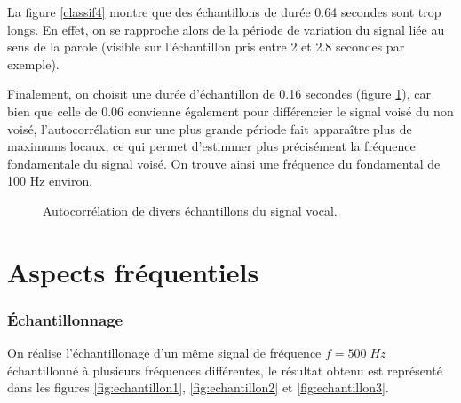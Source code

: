 \documentclass[french]{article}
\begin{document}
La figure \ref{classif4} montre que des échantillons de durée 0.64 secondes sont trop longs. En effet, on se rapproche alors de la période de variation du signal liée au sens de la parole (visible sur l'échantillon pris entre 2 et 2.8 secondes par exemple).


Finalement,  on choisit une durée d'échantillon de 0.16 secondes (figure \ref{classif3}), car bien que celle de 0.06 convienne également pour différencier le signal voisé du non voisé, l'autocorrélation sur une plus grande période fait apparaître plus de maximums locaux, ce qui permet d'estimmer plus précisément la fréquence fondamentale du signal voisé. On trouve ainsi une fréquence du fondamental de 100 Hz environ.

\begin{figure}[h!]
	\centering
	
	\caption{Autocorrélation de divers échantillons du signal vocal.}
	\label{classif3}
\end{figure}

\FloatBarrier
\newpage

\part{Aspects fréquentiels}

\section{Échantillonnage}
On réalise l'échantillonage d'un même signal de fréquence $f=500 \; Hz$ échantillonné à plusieurs fréquences différentes, le résultat obtenu est représenté dans les figures \ref{fig:echantillon1}, \ref{fig:echantillon2} et \ref{fig:echantillon3}.
\end{document}

